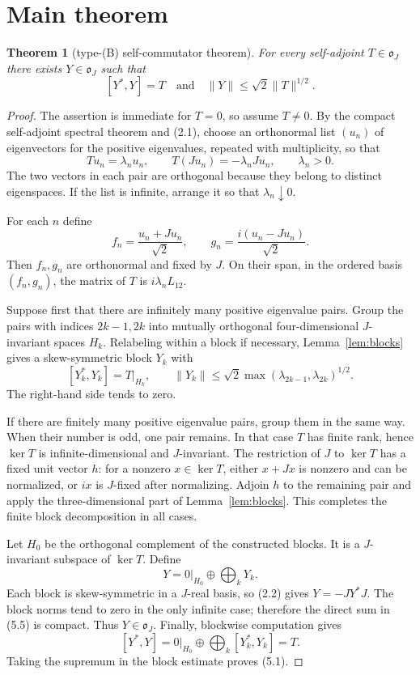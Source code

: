 \documentclass[11pt]{article}
\newtheorem{theorem}{Theorem}
\newcommand{\ooJ}{\mathfrak o_J}
\newcommand{\1}{\mathbf 1}
\newcommand{\norm}[1]{\lVert #1\rVert}
\begin{document}
\section{Main theorem}

\begin{theorem}[type-(B) self-commutator theorem]\label{thm:main}
For every self-adjoint $T\in\ooJ$ there exists $Y\in\ooJ$ such that
\[
 [Y^*,Y]=T
 \quad\text{and}\quad
 \norm Y\leq\sqrt2\norm T^{1/2}.                            \tag{5.1}
\]
\end{theorem}

\begin{proof}
The assertion is immediate for $T=0$, so assume $T\neq0$.  By the compact
self-adjoint spectral theorem and (2.1), choose an orthonormal list
$(u_n)$ of eigenvectors for the positive eigenvalues, repeated with
multiplicity, so that
\[
 Tu_n=\lambda_nu_n,\qquad T(Ju_n)=-\lambda_nJu_n,
 \qquad \lambda_n>0.                                       \tag{5.2}
\]
The two vectors in each pair are orthogonal because they belong to distinct
eigenspaces.  If the list is infinite, arrange it so that
$\lambda_n\downarrow0$.

For each $n$ define
\[
 f_n=\frac{u_n+Ju_n}{\sqrt2},\qquad
 g_n=\frac{i(u_n-Ju_n)}{\sqrt2}.                             \tag{5.3}
\]
Then $f_n,g_n$ are orthonormal and fixed by $J$.  On their span, in the
ordered basis $(f_n,g_n)$, the matrix of $T$ is $i\lambda_nL_{12}$.

Suppose first that there are infinitely many positive eigenvalue pairs.
Group the pairs with indices $2k-1,2k$ into mutually orthogonal
four-dimensional $J$-invariant spaces $H_k$.  Relabeling within a block if
necessary, Lemma~\ref{lem:blocks} gives a skew-symmetric block $Y_k$ with
\[
 [Y_k^*,Y_k]=T|_{H_k},\qquad
 \norm{Y_k}\leq\sqrt2\max(\lambda_{2k-1},\lambda_{2k})^{1/2}.
                                                               \tag{5.4}
\]
The right-hand side tends to zero.

If there are finitely many positive eigenvalue pairs, group them in the same
way.  When their number is odd, one pair remains.  In that case $T$ has
finite rank, hence $\ker T$ is infinite-dimensional and $J$-invariant.
The restriction of $J$ to $\ker T$ has a fixed unit vector $h$: for a nonzero
$x\in\ker T$, either $x+Jx$ is nonzero and can be normalized, or $ix$ is
$J$-fixed after normalizing.  Adjoin $h$ to the remaining pair and apply the
three-dimensional part of Lemma~\ref{lem:blocks}.  This completes the finite
block decomposition in all cases.

Let $H_0$ be the orthogonal complement of the constructed blocks.  It is a
$J$-invariant subspace of $\ker T$.  Define
\[
 Y=0|_{H_0}\oplus\bigoplus_kY_k.                             \tag{5.5}
\]
Each block is skew-symmetric in a $J$-real basis, so (2.2) gives
$Y=-JY^*J$.  The block norms tend to zero in the only infinite case;
therefore the direct sum in (5.5) is compact.  Thus $Y\in\ooJ$.  Finally,
blockwise computation gives
\[
 [Y^*,Y]=0|_{H_0}\oplus\bigoplus_k[Y_k^*,Y_k]=T.
\]
Taking the supremum in the block estimate proves (5.1).
\end{proof}
\end{document}
